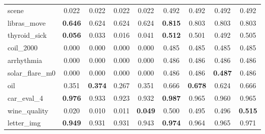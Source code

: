 \begin{figure}[ht]
\begin{tabular}{p{22mm}|*4{p{14mm}}|*4{p{14mm}}}
        scene&\multicolumn{1}{c}{0.022}&\multicolumn{1}{c}{0.022}&\multicolumn{1}{c}{0.022}&\multicolumn{1}{c|}{0.022}&\multicolumn{1}{c}{0.492}&\multicolumn{1}{c}{0.492}&\multicolumn{1}{c}{0.492}&\multicolumn{1}{c}{0.492}\\
        libras\_move&\multicolumn{1}{c}{\textbf{0.646}}&\multicolumn{1}{c}{0.624}&\multicolumn{1}{c}{0.624}&\multicolumn{1}{c|}{0.624}&\multicolumn{1}{c}{\textbf{0.815}}&\multicolumn{1}{c}{0.803}&\multicolumn{1}{c}{0.803}&\multicolumn{1}{c}{0.803}\\
        thyroid\_sick&\multicolumn{1}{c}{\textbf{0.056}}&\multicolumn{1}{c}{0.033}&\multicolumn{1}{c}{0.016}&\multicolumn{1}{c|}{0.041}&\multicolumn{1}{c}{\textbf{0.512}}&\multicolumn{1}{c}{0.501}&\multicolumn{1}{c}{0.492}&\multicolumn{1}{c}{0.505}\\
        coil\_2000&\multicolumn{1}{c}{0.000}&\multicolumn{1}{c}{0.000}&\multicolumn{1}{c}{0.000}&\multicolumn{1}{c|}{0.000}&\multicolumn{1}{c}{0.485}&\multicolumn{1}{c}{0.485}&\multicolumn{1}{c}{0.485}&\multicolumn{1}{c}{0.485}\\
        arrhythmia&\multicolumn{1}{c}{0.000}&\multicolumn{1}{c}{0.000}&\multicolumn{1}{c}{0.000}&\multicolumn{1}{c|}{0.000}&\multicolumn{1}{c}{0.486}&\multicolumn{1}{c}{0.486}&\multicolumn{1}{c}{0.486}&\multicolumn{1}{c}{0.486}\\
        solar\_flare\_m0&\multicolumn{1}{c}{0.000}&\multicolumn{1}{c}{0.000}&\multicolumn{1}{c}{0.000}&\multicolumn{1}{c|}{0.000}&\multicolumn{1}{c}{0.486}&\multicolumn{1}{c}{0.486}&\multicolumn{1}{c}{\textbf{0.487}}&\multicolumn{1}{c}{0.486}\\
        oil&\multicolumn{1}{c}{0.351}&\multicolumn{1}{c}{\textbf{0.374}}&\multicolumn{1}{c}{0.267}&\multicolumn{1}{c|}{0.351}&\multicolumn{1}{c}{0.666}&\multicolumn{1}{c}{\textbf{0.678}}&\multicolumn{1}{c}{0.624}&\multicolumn{1}{c}{0.666}\\
        car\_eval\_4&\multicolumn{1}{c}{\textbf{0.976}}&\multicolumn{1}{c}{0.933}&\multicolumn{1}{c}{0.923}&\multicolumn{1}{c|}{0.932}&\multicolumn{1}{c}{\textbf{0.987}}&\multicolumn{1}{c}{0.965}&\multicolumn{1}{c}{0.960}&\multicolumn{1}{c}{0.965}\\
        wine\_quality&\multicolumn{1}{c}{0.020}&\multicolumn{1}{c}{0.010}&\multicolumn{1}{c}{0.011}&\multicolumn{1}{c|}{\textbf{0.049}}&\multicolumn{1}{c}{0.500}&\multicolumn{1}{c}{0.495}&\multicolumn{1}{c}{0.496}&\multicolumn{1}{c}{\textbf{0.515}}\\
        letter\_img&\multicolumn{1}{c}{\textbf{0.949}}&\multicolumn{1}{c}{0.931}&\multicolumn{1}{c}{0.931}&\multicolumn{1}{c|}{0.943}&\multicolumn{1}{c}{\textbf{0.974}}&\multicolumn{1}{c}{0.964}&\multicolumn{1}{c}{0.965}&\multicolumn{1}{c}{0.971}\\

\end{tabular}
\end{figure}

